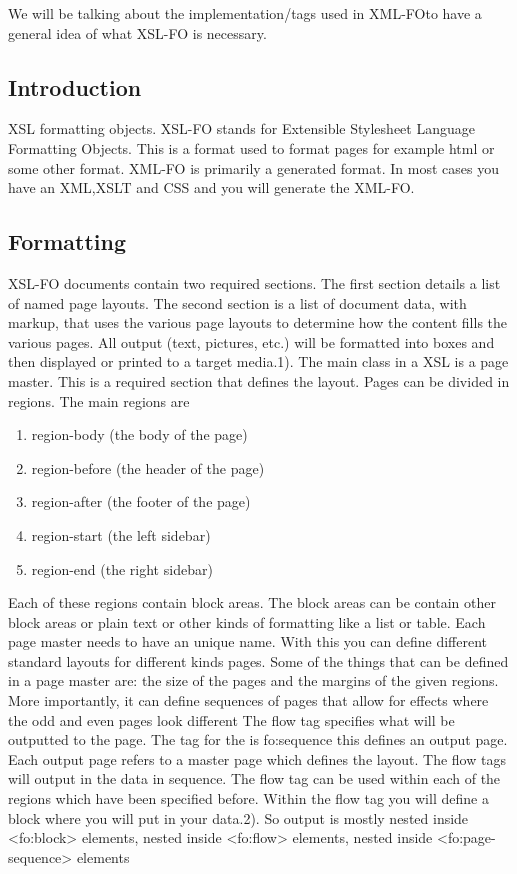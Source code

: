 We will be talking about the implementation/tags used in XML-FOto have a general idea of what XSL-FO is necessary.

\subsection{Introduction}


XSL formatting objects. XSL-FO stands for Extensible Stylesheet Language Formatting Objects. This is a format used to format pages for example html or some other format. XML-FO is primarily a generated format. In most cases you have an XML,XSLT and CSS and you will generate the XML-FO.
\subsection{Formatting}

XSL-FO documents contain two required sections. The first section details a list of named page layouts. The second section is a list of document data, with markup, that uses the various page layouts to determine how the content fills the various pages. All output (text, pictures, etc.) will be formatted into boxes and then displayed or printed to a target media.1). The main class in a XSL is a page master. This is a required section that defines the layout. Pages can be divided in regions. The main regions are

\begin{enumerate}
	\item region-body (the body of the page)
    \item region-before (the header of the page)
    \item region-after (the footer of the page)
    \item region-start (the left sidebar)
    \item region-end (the right sidebar)
\end{enumerate}


Each of these regions contain block areas. The block areas can be contain other block areas or plain text or other kinds of formatting like a list or table. Each page master needs to have an unique name. With this you can define different standard layouts for different kinds pages. Some of the things that can be defined in a page master are: the size of the pages and the margins of the given regions. More importantly, it can define sequences of pages that allow for effects where the odd and even pages look different The flow tag specifies what will be outputted to the page. The tag for the is fo:sequence this defines an output page. Each output page refers to a master page which defines the layout. The flow tags will output in the data in sequence. The flow tag can be used within each of the regions which have been specified before. Within the flow tag you will define a block where you will put in your data.2). So output is mostly nested inside <fo:block> elements, nested inside <fo:flow> elements, nested inside <fo:page-sequence> elements

